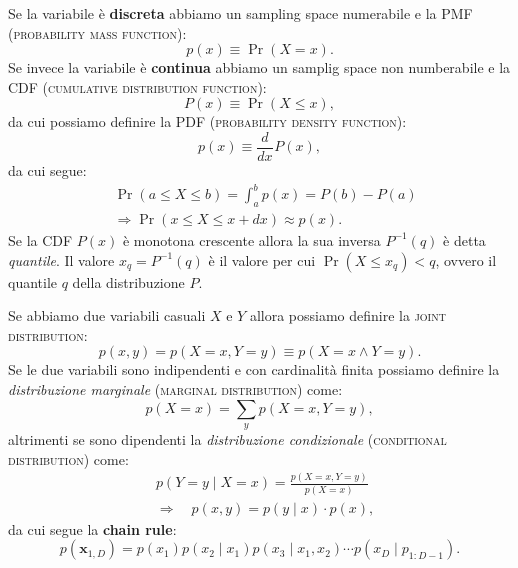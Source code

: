 \documentclass[10pt]{article}
\DeclareMathOperator{\pr}{Pr}
\newcommand{\ve}[1]{\bm{#1}}
\newcommand{\im}[1]{\textsc{#1}}
\newcommand{\et}{\wedge}
\newcommand{\cond}{\mid}
\newcommand{\pare}[1]{
	\ensuremath{\left(#1\right)}
}
\newcommand{\deriv}[3][]{
	\ensuremath{\frac{d^{#1}{#2}}{d{#3}^{#1}}}
}
\theoremstyle{definition}
\begin{document}
Se la variabile è \textbf{discreta} abbiamo un sampling space numerabile e la PMF (\im{probability mass function}):
\begin{equation}
p\pare{x} \equiv \pr\pare{X = x}.
\end{equation}
Se invece la variabile è \textbf{continua} abbiamo un samplig space non numberabile e la CDF (\im{cumulative distribution function}):
\begin{equation}
P\pare{x} \equiv \pr\pare{X \leq x},
\end{equation}
da cui possiamo definire la PDF (\im{probability density function}):
\begin{equation}
p\pare{x} \equiv \deriv{}{x}P\pare{x},
\end{equation}
da cui segue:
\begin{align}
&\pr\pare{a \leq X \leq b} = \int_a^b p\pare{x} = P\pare{b} - P\pare{a} \\
&\Longrightarrow \pr\pare{x \leq X \leq x + dx} \approx p\pare{x}.
\end{align}
Se la CDF $P\pare{x}$ è monotona crescente allora la sua inversa $P^{-1}(q)$ è
detta \textit{quantile}. Il valore $x_q = P^{-1}\pare{q}$ è il valore per cui
$\pr\pare{X\leq x_q} < q$, ovvero il quantile $q$ della distribuzione $P$.

Se abbiamo due variabili casuali $X$ e $Y$ allora possiamo definire la \im{joint
distribution}:
\begin{equation}
p\pare{x, y} = p\pare{X = x, Y = y} \equiv p\pare{X = x\et Y = y}.
\end{equation}
Se le due variabili sono indipendenti e con cardinalità finita possiamo definire la \textit{distribuzione marginale} (\im{marginal distribution}) come:
\begin{equation}
p\pare{X = x} = \sum_y p\pare{X=x, Y=y},
\end{equation}
altrimenti se sono dipendenti la \textit{distribuzione condizionale} (\im{conditional distribution}) come:
\begin{equation}
\begin{split}
&p\pare{Y=y\cond X=x} = \frac{p\pare{X=x, Y=y}}{p\pare{X=x}} \\
&\Longrightarrow\quad p\pare{x, y} = p\pare{y\cond x}\cdot p\pare{x},
\end{split}
\end{equation}
da cui segue la \textbf{chain rule}:
\begin{equation}
p\pare{\ve{x}_{1,D}} = p\pare{x_1} p\pare{x_2\cond x_1} p\pare{x_3\cond x_1, x_2}\cdots p\pare{x_D\cond p_{1: D-1}}.
\end{equation}
\end{document}
